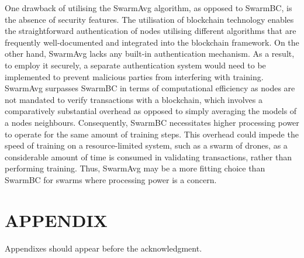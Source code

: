 \documentclass[letterpaper, 10 pt, conference]{ieeeconf}  %
\begin{document}
One drawback of utilising the SwarmAvg algorithm, as opposed to SwarmBC, is the absence of security features. The utilisation of blockchain technology enables the straightforward authentication of nodes utilising different algorithms that are frequently well-documented and integrated into the blockchain framework. On the other hand, SwarmAvg lacks any built-in authentication mechanism. As a result, to employ it securely, a separate authentication system would need to be implemented to prevent malicious parties from interfering with training. \\

SwarmAvg surpasses SwarmBC in terms of computational efficiency as nodes are not mandated to verify transactions with a blockchain, which involves a comparatively substantial overhead as opposed to simply averaging the models of a nodes neighbours. Consequently, SwarmBC necessitates higher processing power to operate for the same amount of training steps. This overhead could impede the speed of training on a resource-limited system, such as a swarm of drones, as a considerable amount of time is consumed in validating transactions, rather than performing training. Thus, SwarmAvg may be a more fitting choice than SwarmBC for swarms where processing power is a concern.

\addtolength{\textheight}{-12cm}   %







\section*{APPENDIX}

Appendixes should appear before the acknowledgment.
\end{document}
